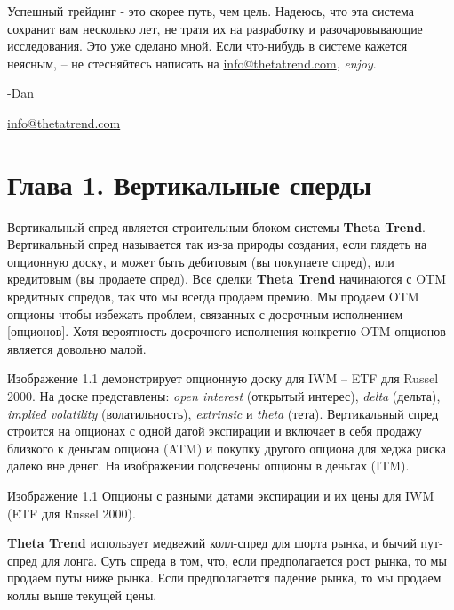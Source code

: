 \documentclass[12pt,DIV=18]{scrartcl}
\begin{document}
\bigskip

Успешный трейдинг - это скорее путь, чем цель. Надеюсь, что эта система сохранит вам несколько лет, не тратя их на разработку и разочаровывающие исследования. Это уже сделано мной. Если что-нибудь в системе кажется неясным, -- не стесняйтесь написать на \textcolor{Blue}{\href{mailto:info@thetatrend.com}{info@thetatrend.com}}, \textit{enjoy}.

\bigskip

-Dan\par
\textcolor{Blue}{\href{mailto:info@thetatrend.com}{info@thetatrend.com}}

\section*{Глава 1. Вертикальные сперды}
\label{chapter1}
\bigskip

Вертикальный спред является строительным блоком системы \textbf{Theta Trend}. Вертикальный спред называется так из-за природы создания, если глядеть на опционную доску, и может быть дебитовым (вы покупаете спред), или кредитовым (вы продаете спред). Все сделки \textbf{Theta Trend} начинаются с OTM кредитных спредов, так что мы всегда продаем премию. Мы продаем OTM опционы чтобы избежать проблем, связанных с досрочным исполнением [опционов]. Хотя вероятность досрочного исполнения конкретно OTM опционов является довольно малой.

\bigskip

Изображение 1.1 демонстрирует опционную доску для IWM -- ETF для Russel 2000. На доске представлены: \textit{open interest} (открытый интерес), \textit{delta} (дельта), \textit{implied  volatility} (волатильность), \textit{extrinsic} и \textit{theta} (тета). Вертикальный спред строится на опционах с одной датой экспирации и включает в себя продажу близкого к деньгам опциона (ATM) и покупку другого опциона для хеджа риска далеко вне денег. На изображении подсвечены опционы в деньгах (ITM).

\bigskip

Изображение 1.1 Опционы с разными датами экспирации и их цены для IWM (ETF для Russel 2000).

\bigskip

\textbf{Theta Trend} использует медвежий колл-спред для шорта рынка, и бычий пут-спред для лонга. Суть спреда в том, что, если предполагается рост рынка, то мы продаем путы ниже рынка. Если предполагается падение рынка, то мы продаем коллы выше текущей цены.
\end{document}

